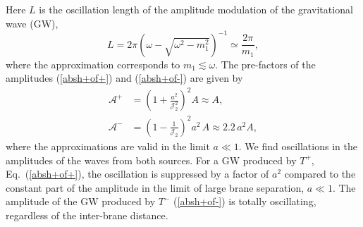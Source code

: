 \documentclass[a4paper,prl,twocolumn,amsmath,amssymb,showpacs]{revtex4}
\begin{document}
Here $L$ is the oscillation length of the amplitude modulation of the 
gravitational wave (GW), 
\begin{equation} 
L= 2\pi \left(\omega - \sqrt{\omega ^2-m_1^2} \right)^{-1}\simeq  
\frac{2\pi}{m_1} ,\label{length} 
\end{equation} 
where the approximation corresponds to $m_1 \lesssim \omega$.  The pre-factors
of the amplitudes (\ref{absh+of+}) and (\ref{absh+of-}) are given by
\begin{align} 
\mathcal{A}^+ &= \left(1+ \frac{a^2}{\mathcal{J}^2_2}\right)^2 A \approx A,
\label{prefacA+} \\ 
\mathcal{A}^- &= \left(1-\frac{1}{\mathcal{J}_2}\right)^2 a^2 \,A 
\approx  2.2 \, a^2A, 
\label{prefacA-} 
\end{align} 
where the approximations are valid in the limit $a\ll 1$. We find oscillations 
in the amplitudes of the waves from both sources. For a GW produced by $T^+$, 
Eq.~(\ref{absh+of+}), the oscillation is suppressed 
by a factor of $a^2$ compared 
to the constant part of the amplitude in the limit of large brane separation, 
$a \ll 1$. The amplitude of the GW produced by $T^-$ (\ref{absh+of-}) is 
totally oscillating, regardless of the inter-brane distance. 
 
\end{document}
